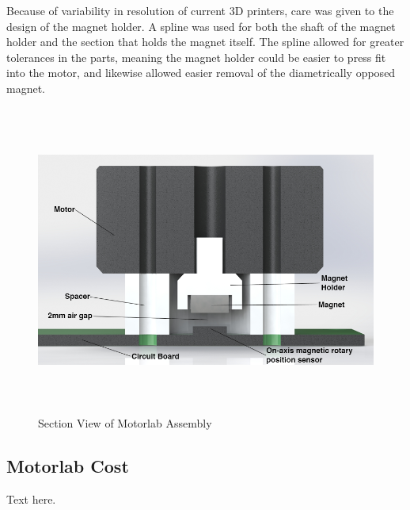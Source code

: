 Because of variability in resolution of current 3D printers, care was given to the design of the magnet holder. A spline was used for both the shaft of the magnet holder and the section that holds the magnet itself. The spline allowed for greater tolerances in the parts, meaning the magnet holder could be easier to press fit into the motor, and likewise allowed easier removal of the diametrically opposed magnet.

\begin{figure}[htb]%

    \includegraphics[height=4in]{figures/section_view_motorlab_assembly.png}

    \caption[Section View of Motorlab Assembly]{Section View of Motorlab Assembly}

    \label{section_view_motorlab}
\end{figure}

\subsection{Motorlab Cost}
\label{makereference2.1.4} 

Text here.

